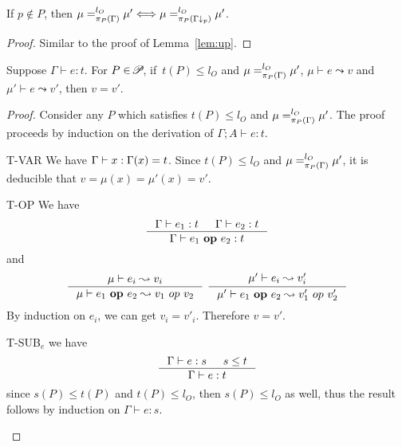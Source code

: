 {{{\begin{lemma}\label{lem:down}
If $p \notin P$, then $\mu =_{\app{\Gamma}{P}}^{l_{O}} \mu' \Longleftrightarrow \mu =_{\app{\Gamma\downarrow_{p}}{P}}^{l_{O}} \mu'$.
\end{lemma}
\begin{proof}
Similar to the proof of Lemma~\ref{lem:up}.
\end{proof}



\begin{lemma}\label{lem:expsafe}
Suppose $\Gamma\vdash e : t$. For $P\in\PPS$, if~$t(P)\leq l_{O}$ and
$\mu =_{\app{\Gamma}{P}}^{l_{O}} \mu'$,  $\mu\vdash e\leadsto v$ and $\mu'\vdash e\leadsto v'$, then $v = v'$.
\end{lemma}
\begin{proof}
Consider any $P$ which satisfies $t(P)\leq l_{O}$ and $\mu =_{\app{\Gamma}{P}}^{l_{O}} \mu'$.
The proof proceeds by induction on the derivation
of $\Gamma;A \vdash e : t$.
\begin{ProofEnumDesc}
\item[T-VAR] We have $\Gamma \vdash \leVAR{x} :\Gamma(x) = t$.
Since $t(P) \leq l_{O}$ and $\mu =_{\app{\Gamma}{P}}^{l_{O}} \mu'$,
it is deducible that $v = \mu(x) = \mu'(x) = v'$.
\item[T-OP] We have
\begin{equation*}
\inference
{\Gamma \vdash e_1 : t & \Gamma \vdash e_2 : t}
{\Gamma \vdash \leOP{e_1}{e_2} : t}
\end{equation*}
and
\begin{equation*}
\inference{\mu \vdash e_i \leadsto v_i}{\mu\vdash \leOP{e_1}{e_2}\leadsto v_1~op~v_2} ~
\inference{\mu' \vdash e_i \leadsto v'_i}{\mu'\vdash \leOP{e_1}{e_2}\leadsto v'_1~op~v'_2}
\end{equation*}
By induction on $e_i$, we can get $v_i = v'_i$. Therefore $v = v'$.
\item[T-SUB$_e$] we have
\begin{equation*}
\inference
{\Gamma\vdash e : s & s \leq t}
{\Gamma\vdash e : t}
\end{equation*}
since $s(P)\leq t(P)$ and $t(P)\leq l_{O} $, then $s(P)\leq l_{O}$ as well,
thus the result follows by induction on $\Gamma\vdash e : s$.
\end{ProofEnumDesc}
\end{proof}


}}}
